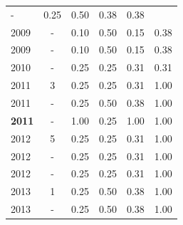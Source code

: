 \begin{table}[H]
\begin{tabular}{| l | c | c | c | c | c |}
          -
          &
          0.25
          &
          0.50
          &
          0.38
          &
            {\color{red} 0.38}
          \\
            2009
          &
          -
          &
          0.10
          &
          0.50
          &
          0.15
          &
            {\color{red} 0.38}
          \\
            2009
          &
          -
          &
          0.10
          &
          0.50
          &
          0.15
          &
            {\color{red} 0.38}
          \\
\hline
            2010
          &
          -
          &
          0.25
          &
          0.25
          &
          0.31
          &
            {\color{red} 0.31}
          \\
\hline
            2011
          &
          3
          &
          0.25
          &
          0.25
          &
          0.31
          &
            {\color{blue} 1.00}
          \\
            2011
          &
          -
          &
          0.25
          &
          0.50
          &
          0.38
          &
            {\color{blue} 1.00}
          \\
            {\bf 2011}
          &
          -
          &
          1.00
          &
          0.25
          &
          1.00
          &
            {\color{blue} 1.00}
          \\
\hline
            2012
          &
          5
          &
          0.25
          &
          0.25
          &
          0.31
          &
            {\color{blue} 1.00}
          \\
            2012
          &
          -
          &
          0.25
          &
          0.25
          &
          0.31
          &
            {\color{blue} 1.00}
          \\
            2012
          &
          -
          &
          0.25
          &
          0.25
          &
          0.31
          &
            {\color{blue} 1.00}
          \\
\hline
            2013
          &
          1
          &
          0.25
          &
          0.50
          &
          0.38
          &
            {\color{blue} 1.00}
          \\
            2013
          &
          -
          &
          0.25
          &
          0.50
          &
          0.38
          &
            {\color{blue} 1.00}
          \\

\end{tabular}
\end{table}
